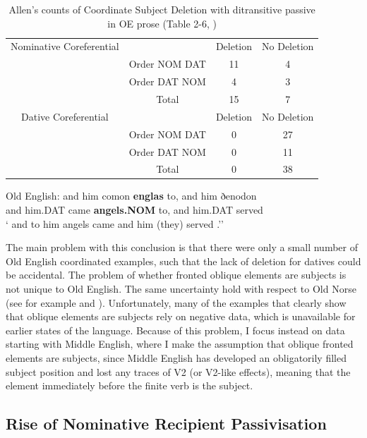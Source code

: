 	\begin{table}[t]
		\begin{tabular}{cccc}
			Nominative Coreferential & & Deletion & No Deletion \\
			& Order NOM DAT & 11 & 4 \\
			& Order DAT NOM & 4 & 3 \\
			& Total & 15 & 7 \\
			\hline
			Dative Coreferential & & Deletion & No Deletion \\
			& Order NOM DAT & 0 & 27 \\
			& Order DAT NOM & 0 & 11 \\
			& Total & 0 & 38 \\
		\end{tabular}
		\caption{Allen's counts of Coordinate Subject Deletion with ditransitive passive in OE prose (Table 2-6, \citealt{Allen.1999})}
		\label{tab:AllenOECSD}
	\end{table}

	\begin{exe}
		\ex \label{ex:OECSD} Old English:
		\gll and him comon \textbf{englas} to, and him ðenodon\\
		and him.DAT came \textbf{angels.NOM} to, and him.DAT served\\
		\trans ` and to him angels came and him (they) served \citep[ex. 34]{Allen.1999}.''
	\end{exe}

	The main problem with this conclusion is that there were only a small number of Old English coordinated examples, such that the lack of deletion for datives could be accidental. The problem of whether fronted oblique elements are subjects is not unique to Old English. The same uncertainty hold with respect to Old Norse (see for example \citealt{Kristoffersen.1991,Kristoffersen.1994} and \citealt{Bardal.2001b}). Unfortunately, many of the examples that clearly show that oblique elements are subjects rely on negative data, which is unavailable for earlier states of the language. Because of this problem, I focus instead on data starting with Middle English, where I make the assumption that oblique fronted elements are subjects, since Middle English has developed an obligatorily filled subject position and lost any traces of V2 (or V2-like effects), meaning that the element immediately before the finite verb is the subject.

	\subsection{Rise of Nominative Recipient Passivisation}

